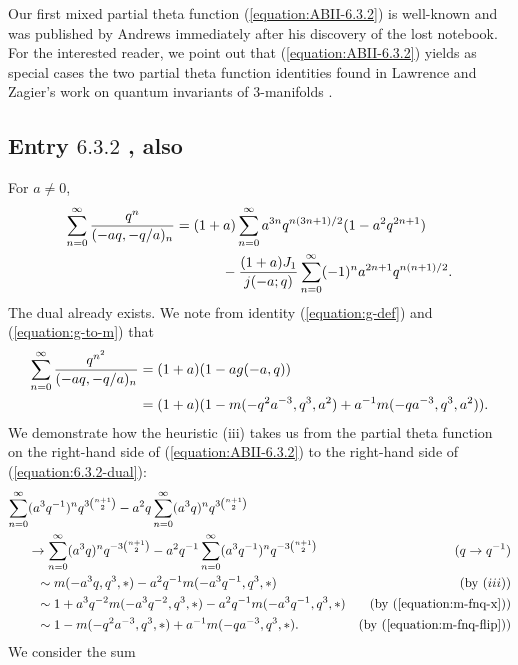 \documentclass[12pt,reqno]{amsart}
\theoremstyle{remark}
\theoremstyle{definition}
\numberwithin{theorem}{section} \numberwithin{equation}{section}
\numberwithin{example}{section}
\begin{document}
{Our first mixed partial theta function (\ref{equation:ABII-6.3.2}) is well-known and was published by Andrews \cite{A1} immediately after his discovery of the lost notebook.  For the interested reader, we point out that (\ref{equation:ABII-6.3.2}) yields as special cases the two partial theta function identities found in Lawrence and Zagier's work on quantum invariants of $3$-manifolds \cite{LZ}. 

\subsection{Entry $6.3.2$ \cite{ABII}, also \cite[p. 7]{RLN}}

For $a\ne 0$,
{\allowdisplaybreaks \begin{align}
\sum_{n=0}^{\infty}\frac{q^n}{(-aq,-q/a)_n}&=(1+a)\sum_{n=0}^{\infty}a^{3n}q^{n(3n+1)/2}(1-a^2q^{2n+1})\label{equation:ABII-6.3.2}\\
& \ \ \ \ \ \ \ \ \ \ -\frac{(1+a)J_1}{j(-a;q)}\sum_{n=0}^{\infty}(-1)^na^{2n+1}q^{n(n+1)/2}.\notag
\end{align}}
The dual already exists.  We note from identity (\ref{equation:g-def}) and (\ref{equation:g-to-m}) that
\begin{align}
\sum_{n=0}^{\infty}\frac{q^{n^2}}{(-aq,-q/a)_n}&=(1+a)(1-ag(-a,q))\label{equation:6.3.2-dual}\\
&=(1+a)(1-m(-q^2a^{-3},q^3,a^2)+a^{-1}m(-qa^{-3},q^3,a^2)).\notag
\end{align}
We demonstrate how the heuristic (iii) takes us from the partial theta function on the right-hand side of (\ref{equation:ABII-6.3.2}) to the right-hand side of (\ref{equation:6.3.2-dual}):
\begin{align*}
\sum_{n=0}^{\infty}&(a^3q^{-1})^nq^{3\binom{n+1}{2}}-a^2q\sum_{n=0}^{\infty}(a^3q)^nq^{3\binom{n+1}{2}} \\
&\rightarrow \sum_{n=0}^{\infty}(a^3q)^nq^{-3\binom{n+1}{2}}-a^2q^{-1}\sum_{n=0}^{\infty}(a^3q^{-1})^nq^{-3\binom{n+1}{2}} &(q\rightarrow q^{-1})\\
& \ \ \sim m(-a^3q,q^3,*)-a^2q^{-1}m(-a^3q^{-1},q^3,*)&(\text{by }(iii))\\
& \ \ \sim  1+a^3q^{-2}m(-a^3q^{-2},q^3,*)-a^2q^{-1}m(-a^3q^{-1},q^3,*)&({\text{by }} (\ref{equation:m-fnq-x}))\\
& \ \ \sim  1-m(-q^2a^{-3},q^3,*)+a^{-1}m(-qa^{-3},q^3,*).&({\text{by }} (\ref{equation:m-fnq-flip}))
\end{align*}
We consider the sum
\begin{equation}

\end{equation}}
\end{document}
